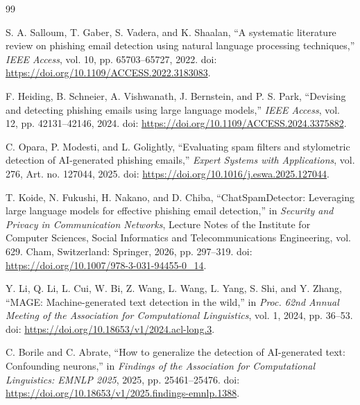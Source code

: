 \documentclass[conference]{IEEEtran}
\begin{document}
\FloatBarrier
\raggedbottom

\begingroup
\setlength{\emergencystretch}{2em}

\begin{thebibliography}{99}
\setlength{\itemsep}{0pt}
\setlength{\parsep}{0pt}

S. A. Salloum, T. Gaber, S. Vadera, and K. Shaalan,
``A systematic literature review on phishing email detection using
natural language processing techniques,''
\emph{IEEE Access}, vol. 10, pp. 65703--65727, 2022.
doi: \url{https://doi.org/10.1109/ACCESS.2022.3183083}.

F. Heiding, B. Schneier, A. Vishwanath, J. Bernstein,
and P. S. Park,
``Devising and detecting phishing emails using large language models,''
\emph{IEEE Access}, vol. 12, pp. 42131--42146, 2024.
doi: \url{https://doi.org/10.1109/ACCESS.2024.3375882}.

C. Opara, P. Modesti, and L. Golightly,
``Evaluating spam filters and stylometric detection of AI-generated
phishing emails,''
\emph{Expert Systems with Applications}, vol. 276,
Art. no. 127044, 2025.
doi: \url{https://doi.org/10.1016/j.eswa.2025.127044}.

T. Koide, N. Fukushi, H. Nakano, and D. Chiba,
``ChatSpamDetector: Leveraging large language models for effective
phishing email detection,''
in \emph{Security and Privacy in Communication Networks},
Lecture Notes of the Institute for Computer Sciences, Social Informatics
and Telecommunications Engineering, vol. 629.
Cham, Switzerland: Springer, 2026, pp. 297--319.
doi: \url{https://doi.org/10.1007/978-3-031-94455-0_14}.

Y. Li, Q. Li, L. Cui, W. Bi, Z. Wang, L. Wang, L. Yang,
S. Shi, and Y. Zhang,
``MAGE: Machine-generated text detection in the wild,''
in \emph{Proc. 62nd Annual Meeting of the Association for
Computational Linguistics}, vol. 1, 2024, pp. 36--53.
doi: \url{https://doi.org/10.18653/v1/2024.acl-long.3}.

C. Borile and C. Abrate,
``How to generalize the detection of AI-generated text:
Confounding neurons,''
in \emph{Findings of the Association for Computational Linguistics:
EMNLP 2025}, 2025, pp. 25461--25476.
doi: \url{https://doi.org/10.18653/v1/2025.findings-emnlp.1388}.


\end{thebibliography}
\end{document}
